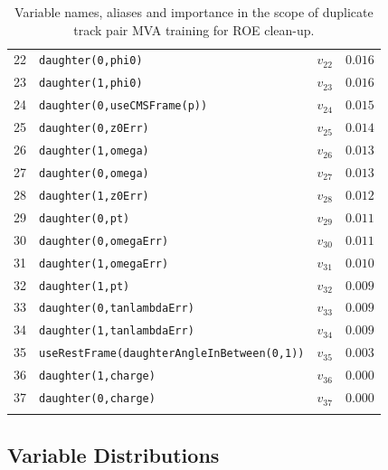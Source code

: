 \begin{longtable}{c|l|c|l}
22 &\texttt{\footnotesize daughter(0,phi0)} & $v_{22}$ & $0.016$ \\ 
23 &\texttt{\footnotesize daughter(1,phi0)} & $v_{23}$ & $0.016$ \\ 
24 &\texttt{\footnotesize daughter(0,useCMSFrame(p))} & $v_{24}$ & $0.015$ \\ 
25 &\texttt{\footnotesize daughter(0,z0Err)} & $v_{25}$ & $0.014$ \\ 
26 &\texttt{\footnotesize daughter(1,omega)} & $v_{26}$ & $0.013$ \\ 
27 &\texttt{\footnotesize daughter(0,omega)} & $v_{27}$ & $0.013$ \\ 
28 &\texttt{\footnotesize daughter(1,z0Err)} & $v_{28}$ & $0.012$ \\ 
29 &\texttt{\footnotesize daughter(0,pt)} & $v_{29}$ & $0.011$ \\ 
30 &\texttt{\footnotesize daughter(0,omegaErr)} & $v_{30}$ & $0.011$ \\ 
31 &\texttt{\footnotesize daughter(1,omegaErr)} & $v_{31}$ & $0.010$ \\ 
32 &\texttt{\footnotesize daughter(1,pt)} & $v_{32}$ & $0.009$ \\ 
33 &\texttt{\footnotesize daughter(0,tanlambdaErr)} & $v_{33}$ & $0.009$ \\ 
34 &\texttt{\footnotesize daughter(1,tanlambdaErr)} & $v_{34}$ & $0.009$ \\ 
35 &\texttt{\footnotesize useRestFrame(daughterAngleInBetween(0,1))} & $v_{35}$ & $0.003$ \\ 
36 &\texttt{\footnotesize daughter(1,charge)} & $v_{36}$ & $0.000$ \\ 
37 &\texttt{\footnotesize daughter(0,charge)} & $v_{37}$ & $0.000$ \\ 
\bottomrule
\captionsetup{width=0.8\linewidth}
\caption{Variable names, aliases and importance in the scope of duplicate track pair MVA training for ROE clean-up.}
\end{longtable}


\subsection{Variable Distributions}

